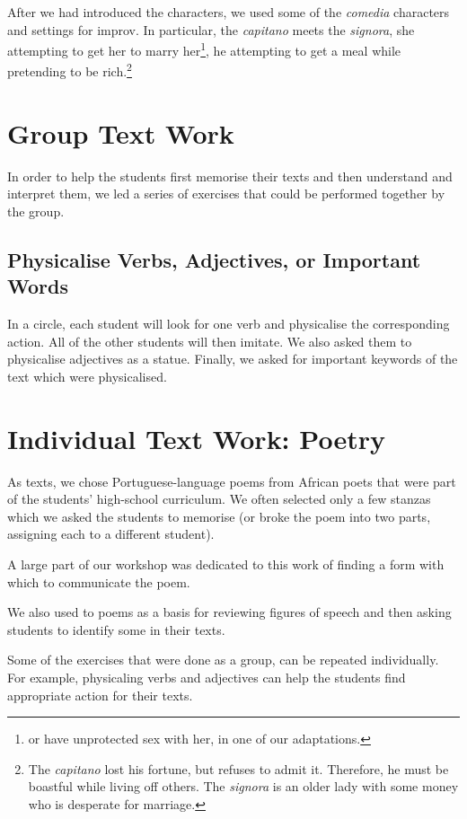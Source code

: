 \documentclass[article,twocolumn,twoside]{memoir}
\begin{document}
After we had introduced the characters, we used some of the \textit{comedia}
characters and settings for improv. In particular, the \textit{capitano} meets
the \textit{signora}, she attempting to get her to marry her\footnote{or have
unprotected sex with her, in one of our adaptations.}, he attempting to get a
meal while pretending to be rich.\footnote{The \textit{capitano} lost his
fortune, but refuses to admit it. Therefore, he must be boastful while living
off others. The \textit{signora} is an older lady with some money who is
desperate for marriage.}

\section{Group Text Work}

In order to help the students first memorise their texts and then understand
and interpret them, we led a series of exercises that could be performed
together by the group.

\subsection{Physicalise Verbs, Adjectives, or Important Words}

In a circle, each student will look for one verb and physicalise the
corresponding action. All of the other students will then imitate. We also
asked them to physicalise adjectives as a statue. Finally, we asked for
important keywords of the text which were physicalised.

\section{Individual Text Work: Poetry}

As texts, we chose Portuguese-language poems from African poets that were part
of the students' high-school curriculum. We often selected only a few stanzas
which we asked the students to memorise (or broke the poem into two parts,
assigning each to a different student).

A large part of our workshop was dedicated to this work of finding a form with
which to communicate the poem.

We also used to poems as a basis for reviewing figures of speech and then
asking students to identify some in their texts.

Some of the exercises that were done as a group, can be repeated individually.
For example, physicaling verbs and adjectives can help the students find
appropriate action for their texts.
\end{document}
